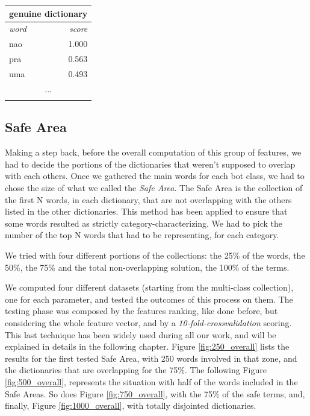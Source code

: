 \small
\begin{center}
	\begin{tabular}{lllll}
		\multicolumn{5}{c}{\textbf{genuine dictionary}} \\
		\hline\hline
		\multicolumn{4}{l}{\textit{word}} & 
		\multicolumn{1}{r}{\textit{score}}\\
		\hline\hline
		\multicolumn{4}{l}{nao} & 
		\multicolumn{1}{r}{1.000}\\
		\multicolumn{4}{l}{pra} & 
		\multicolumn{1}{r}{0.563}\\
		\multicolumn{4}{l}{uma} & 
		\multicolumn{1}{r}{0.493}\\
		\multicolumn{5}{c}{...} \\
		\hline\\
	\end{tabular}
\end{center}
\normalsize

\subsection{Safe Area}
Making a step back, before the overall computation of this group of features, we had to decide the portions of the dictionaries that weren't supposed to overlap with each others.
Once we gathered the main words for each bot class, we had to chose the size of what we called the \textit{Safe Area}.
The Safe Area is the collection of the first N words, in each dictionary, that are not overlapping with the others listed in the other dictionaries.
This method has been applied to ensure that some words resulted as strictly category-characterizing.
We had to pick the number of the top N words that had to be representing, for each category.

We tried with four different portions of the collections: the 25\% of the words, the 50\%, the 75\% and the total non-overlapping solution, the 100\% of the terms.

We computed four different datasets (starting from the multi-class collection), one for each parameter, and tested the outcomes of this process on them. The testing phase was composed by the features ranking, like done before, but considering the whole feature vector, and by a \textit{10-fold-crossvalidation} scoring. This last technique has been widely used during all our work, and will be explained in details in the following chapter.
Figure \ref{fig:250_overall} lists the results for the first tested Safe Area, with 250 words involved in that zone, and the dictionaries that are overlapping for the 75\%. The following Figure \ref{fig:500_overall}, represents the situation with half of the words included in the Safe Areas. So does Figure \ref{fig:750_overall}, with the 75\% of the safe terms, and, finally, Figure \ref{fig:1000_overall}, with totally disjointed dictionaries.

